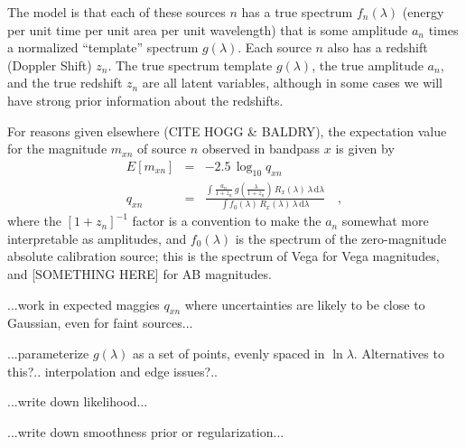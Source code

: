 \documentclass[12pt,preprint,letterpaper]{aastex}
\newcommand{\dd}{\mathrm{d}}
\begin{document}
The model is that each of these sources $n$ has a true spectrum $f_n(\lambda)$ (energy per unit time per unit area per unit wavelength)
  that is some amplitude $a_n$ times a normalized ``template'' spectrum $g(\lambda)$.
Each source $n$ also has a redshift (Doppler Shift) $z_n$.
The true spectrum template $g(\lambda)$, the true amplitude $a_n$, and the true redshift $z_n$ are all latent variables,
  although in some cases we will have strong prior information about the redshifts.

For reasons given elsewhere (CITE HOGG \& BALDRY), the expectation value for the magnitude $m_{xn}$
  of source $n$ observed in bandpass $x$ is given by
\begin{eqnarray}
E[m_{xn}] &=&
  -2.5\,\log_{10} q_{xn}
\\
q_{xn} &=&
  \frac{\displaystyle\int\frac{a_n}{1+z_n}\,g(\frac{\lambda}{1+z_n})\,R_x(\lambda)\,\lambda\,\dd\lambda}%
       {\displaystyle\int f_0(\lambda)\,R_x(\lambda)\,\lambda\,\dd\lambda}%
\quad ,
\end{eqnarray}
where the $[1+z_n]^{-1}$ factor is a convention to make the $a_n$ somewhat more interpretable as amplitudes,
  and $f_0(\lambda)$ is the spectrum of the zero-magnitude absolute calibration source;
  this is the spectrum of Vega for Vega magnitudes, and
  [SOMETHING HERE] for AB magnitudes.

...work in expected maggies $q_{xn}$ where uncertainties are likely to be close to Gaussian, even for faint sources...

...parameterize $g(\lambda)$ as a set of points, evenly spaced in $\ln\lambda$.  Alternatives to this?.. interpolation and edge issues?..

...write down likelihood...

...write down smoothness prior or regularization...
\end{document}
